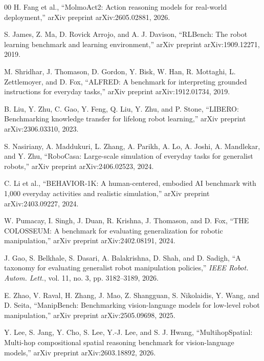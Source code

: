 \begin{thebibliography}{00}
H. Fang et al.,
``MolmoAct2: Action reasoning models for real-world deployment,''
arXiv preprint arXiv:2605.02881, 2026.


S. James, Z. Ma, D. Rovick Arrojo, and A. J. Davison,
``RLBench: The robot learning benchmark and learning environment,''
arXiv preprint arXiv:1909.12271, 2019.

M. Shridhar, J. Thomason, D. Gordon, Y. Bisk, W. Han,
R. Mottaghi, L. Zettlemoyer, and D. Fox,
``ALFRED: A benchmark for interpreting grounded instructions for
everyday tasks,''
arXiv preprint arXiv:1912.01734, 2019.

B. Liu, Y. Zhu, C. Gao, Y. Feng, Q. Liu, Y. Zhu, and P. Stone,
``LIBERO: Benchmarking knowledge transfer for lifelong robot learning,''
arXiv preprint arXiv:2306.03310, 2023.

S. Nasiriany, A. Maddukuri, L. Zhang, A. Parikh, A. Lo,
A. Joshi, A. Mandlekar, and Y. Zhu,
``RoboCasa: Large-scale simulation of everyday tasks for generalist
robots,''
arXiv preprint arXiv:2406.02523, 2024.

C. Li et al.,
``BEHAVIOR-1K: A human-centered, embodied AI benchmark with 1,000
everyday activities and realistic simulation,''
arXiv preprint arXiv:2403.09227, 2024.

W. Pumacay, I. Singh, J. Duan, R. Krishna, J. Thomason, and D. Fox,
``THE COLOSSEUM: A benchmark for evaluating generalization for robotic
manipulation,''
arXiv preprint arXiv:2402.08191, 2024.


J. Gao, S. Belkhale, S. Dasari, A. Balakrishna, D. Shah, and D. Sadigh,
``A taxonomy for evaluating generalist robot manipulation policies,''
\emph{IEEE Robot. Autom. Lett.}, vol. 11, no. 3,
pp. 3182--3189, 2026.

E. Zhao, V. Raval, H. Zhang, J. Mao, Z. Shangguan,
S. Nikolaidis, Y. Wang, and D. Seita,
``ManipBench: Benchmarking vision-language models for low-level robot
manipulation,''
arXiv preprint arXiv:2505.09698, 2025.

Y. Lee, S. Jang, Y. Cho, S. Lee, Y.-J. Lee, and S. J. Hwang,
``MultihopSpatial: Multi-hop compositional spatial reasoning benchmark
for vision-language models,''
arXiv preprint arXiv:2603.18892, 2026.


\end{thebibliography}
